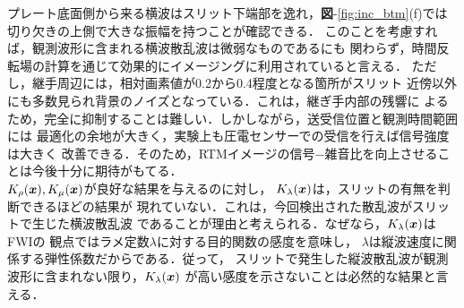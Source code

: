 プレート底面側から来る横波はスリット下端部を逸れ，{\bf 図}-\ref{fig:inc_btm}(f)では
切り欠きの上側で大きな振幅を持つことが確認できる．
このことを考慮すれば，観測波形に含まれる横波散乱波は微弱なものであるにも
関わらず，時間反転場の計算を通じて効果的にイメージングに利用されていると言える．
ただし，継手周辺には，相対画素値が0.2から0.4程度となる箇所がスリット
近傍以外にも多数見られ背景のノイズとなっている．これは，継ぎ手内部の残響に
よるため，完全に抑制することは難しい．しかしながら，送受信位置と観測時間範囲には
最適化の余地が大きく，実験上も圧電センサーでの受信を行えば信号強度は大きく
改善できる．そのため，RTMイメージの信号−雑音比を向上させることは今後十分に期待がもてる．
\\
\hspace{\parindent}
$K_\rho(\boldsymbol{x}), K_\mu(\boldsymbol{x})$が良好な結果を与えるのに対し，
$K_\lambda(\boldsymbol{x})$は，スリットの有無を判断できるほどの結果が
現れていない．これは，今回検出された散乱波がスリットで生じた横波散乱波
であることが理由と考えられる．なぜなら，$K_{\lambda}(\boldsymbol{x})$はFWIの
観点ではラメ定数$\lambda$に対する目的関数の感度を意味し，
$\lambda$は縦波速度に関係する弾性係数だからである．従って，
スリットで発生した縦波散乱波が観測波形に含まれない限り，$K_\lambda(\boldsymbol{x})$
が高い感度を示さないことは必然的な結果と言える．

